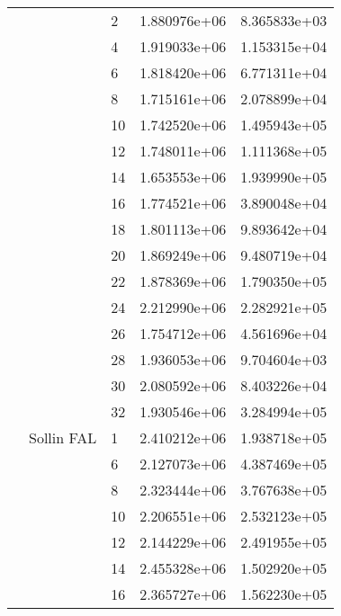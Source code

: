 \begin{tabular}{lllrr}
                      &            & 2  &  1.880976e+06 &  8.365833e+03 \\
                      &            & 4  &  1.919033e+06 &  1.153315e+04 \\
                      &            & 6  &  1.818420e+06 &  6.771311e+04 \\
                      &            & 8  &  1.715161e+06 &  2.078899e+04 \\
                      &            & 10 &  1.742520e+06 &  1.495943e+05 \\
                      &            & 12 &  1.748011e+06 &  1.111368e+05 \\
                      &            & 14 &  1.653553e+06 &  1.939990e+05 \\
                      &            & 16 &  1.774521e+06 &  3.890048e+04 \\
                      &            & 18 &  1.801113e+06 &  9.893642e+04 \\
                      &            & 20 &  1.869249e+06 &  9.480719e+04 \\
                      &            & 22 &  1.878369e+06 &  1.790350e+05 \\
                      &            & 24 &  2.212990e+06 &  2.282921e+05 \\
                      &            & 26 &  1.754712e+06 &  4.561696e+04 \\
                      &            & 28 &  1.936053e+06 &  9.704604e+03 \\
                      &            & 30 &  2.080592e+06 &  8.403226e+04 \\
                      &            & 32 &  1.930546e+06 &  3.284994e+05 \\
                      & Sollin FAL & 1  &  2.410212e+06 &  1.938718e+05 \\
                      &            & 6  &  2.127073e+06 &  4.387469e+05 \\
                      &            & 8  &  2.323444e+06 &  3.767638e+05 \\
                      &            & 10 &  2.206551e+06 &  2.532123e+05 \\
                      &            & 12 &  2.144229e+06 &  2.491955e+05 \\
                      &            & 14 &  2.455328e+06 &  1.502920e+05 \\
                      &            & 16 &  2.365727e+06 &  1.562230e+05 \\

\end{tabular}
